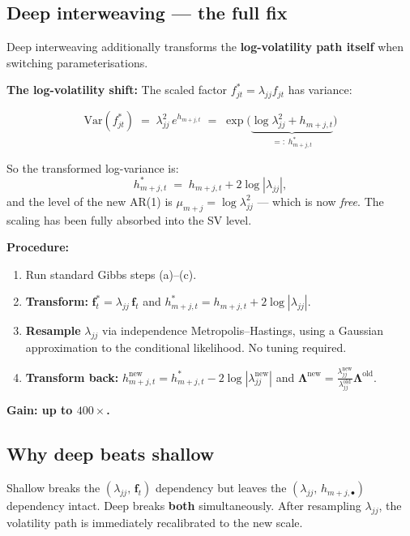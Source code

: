 \documentclass[11pt, a4paper]{article}\usepackage[]{graphicx}\usepackage[]{xcolor}
\newcommand{\stress}[1]{\textbf{#1}}
\begin{document}
\subsection{Deep interweaving --- the full fix}

Deep interweaving additionally transforms the \stress{log-volatility path
itself} when switching parameterisations.

\textbf{The log-volatility shift:}
The scaled factor $f_{jt}^* = \lambda_{jj} f_{jt}$ has variance:

\begin{formulabox}
\[
  \mathrm{Var}(f_{jt}^*)
  \;=\; \lambda_{jj}^2\, e^{h_{m+j,t}}
  \;=\; \exp\!\bigl(\underbrace{\log\lambda_{jj}^2 + h_{m+j,t}}_{=:\; h^*_{m+j,t}}\bigr)
\]
\end{formulabox}

So the transformed log-variance is:
\[
  h^*_{m+j,t} \;=\; h_{m+j,t} + 2\log|\lambda_{jj}|,
\]
and the level of the new AR(1) is $\mu_{m+j} = \log\lambda_{jj}^2$ ---
which is now \textit{free}.  The scaling has been fully absorbed into the SV
level.

\textbf{Procedure:}
\begin{enumerate}[itemsep=3pt]
  \item Run standard Gibbs steps (a)--(c).
  \item \textbf{Transform:}
        $\mathbf{f}_t^* = \lambda_{jj}\,\mathbf{f}_t$
        and $h^*_{m+j,t} = h_{m+j,t} + 2\log|\lambda_{jj}|$.
  \item \textbf{Resample} $\lambda_{jj}$ via independence Metropolis--Hastings,
        using a Gaussian approximation to the conditional likelihood.
        No tuning required.
  \item \textbf{Transform back:}
        $h_{m+j,t}^{\mathrm{new}} = h^*_{m+j,t} - 2\log|\lambda_{jj}^{\mathrm{new}}|$
        and $\boldsymbol{\Lambda}^{\mathrm{new}} =
        \frac{\lambda_{jj}^{\mathrm{new}}}{\lambda_{jj}^{\mathrm{old}}}
        \boldsymbol{\Lambda}^{\mathrm{old}}$.
\end{enumerate}

\textbf{Gain: up to $400\times$.}

\subsection{Why deep beats shallow}

Shallow breaks the $(\lambda_{jj},\, \mathbf{f}_t)$ dependency but leaves
the $(\lambda_{jj},\, h_{m+j,\bullet})$ dependency intact.  Deep breaks
\textbf{both} simultaneously.  After resampling $\lambda_{jj}$, the
volatility path is immediately recalibrated to the new scale.
\end{document}
